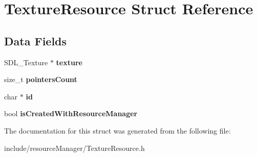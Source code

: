 \hypertarget{struct_texture_resource}{}\section{Texture\+Resource Struct Reference}
\label{struct_texture_resource}
\subsection*{Data Fields}
\begin{DoxyCompactItemize}
\item 
\hypertarget{struct_texture_resource_a859b8efbf9abe8e82757ee5c75a0c97c}{}\label{struct_texture_resource_a859b8efbf9abe8e82757ee5c75a0c97c} 
S\+D\+L\+\_\+\+Texture $\ast$ {\bfseries texture}
\item 
\hypertarget{struct_texture_resource_aa058e87a17f5f5079be31c1631ed5f50}{}\label{struct_texture_resource_aa058e87a17f5f5079be31c1631ed5f50} 
size\+\_\+t {\bfseries pointers\+Count}
\item 
\hypertarget{struct_texture_resource_aecb3b0d045ada529257a2fbf8f829599}{}\label{struct_texture_resource_aecb3b0d045ada529257a2fbf8f829599} 
char $\ast$ {\bfseries id}
\item 
\hypertarget{struct_texture_resource_adcd8ef68b8cee94150537c32674888ce}{}\label{struct_texture_resource_adcd8ef68b8cee94150537c32674888ce} 
bool {\bfseries is\+Created\+With\+Resource\+Manager}
\end{DoxyCompactItemize}


The documentation for this struct was generated from the following file\+:\begin{DoxyCompactItemize}
\item 
include/resource\+Manager/Texture\+Resource.\+h\end{DoxyCompactItemize}
